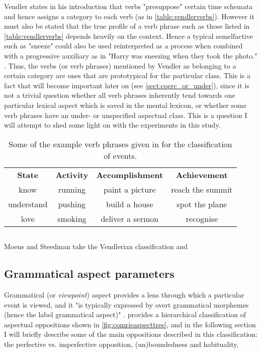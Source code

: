 Vendler states in his introduction that verbs "presuppose" certain time schemata and hence assigns a category to each verb (as in \ref{table:vendlerverbs}). However it must also be stated that the true profile of a verb phrase such as those listed in \ref{table:vendlerverbs} depends heavily on the context. Hence a typical semelfactive such as "sneeze" could also be used reinterpreted as a process when combined with a progressive auxiliary as in "Harry was sneezing when they took the photo." \citep{moens-steedman-1988-temporal}. Thus, the verbs (or verb phrases) mentioned by Vendler as belonging to a certain category are ones that are prototypical for the particular class. This is a fact that will become important later on (see \ref{sect:coerc_or_under}), since it is not a trivial question whether all verb phrases inherently tend towards one particular lexical aspect which is saved in the mental lexicon, or whether some verb phrases have an under- or unspecified aspectual class. This is a question I will attempt to shed some light on with the experiments in this study.

\begin{table}
    \centering
    \begin{tabular}{|c|c|c|c|}
        
        \textbf{State} & \textbf{Activity} & \textbf{Accomplishment} & \textbf{Achievement} \\
        know & running & paint a picture & reach the summit \\
        understand & pushing & build a house & spot the plane \\
        love & smoking & deliver a sermon & recognise
    \end{tabular}
    \caption{Some of the example verb phrases given in \citet{vendler57} for the classification of events.}
\end{table}
\label{table:vendlerverbs}

\subsection*{\citet{moens-steedman-1988-temporal}}
Moens and Steedman take the Vendlerian classification and 
\subsection{Grammatical aspect parameters}
Grammatical (or \emph{viewpoint}) aspect provides a lens through which a particular event is viewed, and it "is typically expressed by overt grammatical morphemes (hence the label grammatical aspect)" \citep{Chapter1IntroductionCrossLinguisticPerspectivesontheSemanticsofGrammaticalAspect}. \citet{comrie1976aspect} provides a hierarchical classification of aspectual oppositions shown in \ref{fig:comrieaspecttree}, and in the following section I will briefly describe some of the main oppositions described in this classification: the perfective vs. imperfective opposition, (un)boundedness and habituality, 


